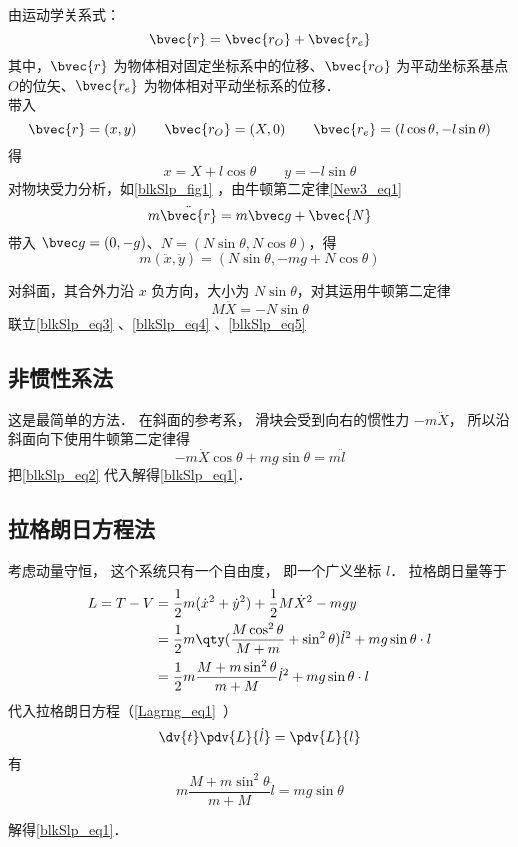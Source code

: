 由运动学关系式：
\begin{equation}
\bvec{r}=\bvec{r_{O}}+\bvec{r_{e}}
\end{equation}
其中，$\bvec{r}$ 为物体相对固定坐标系中的位移、$\bvec{r_{O}}$ 为平动坐标系基点$O$的位矢、$\bvec{r_{e}}$ 为物体相对平动坐标系的位移．\\
带入
\begin{equation}
\bvec{r}=(x,y)\qquad \bvec{r_O}=(X,0)\qquad \bvec{r_e}=(l\cos\theta,-l\sin\theta)
\end{equation}
得
\begin{equation}\label{blkSlp_eq3}
x=X+l\cos\theta \qquad y=-l\sin\theta
\end{equation}
对物块受力分析，如\autoref{blkSlp_fig1} ，由牛顿第二定律\autoref{New3_eq1}~
\begin{equation}
m\ddot{\bvec{r}}=m\bvec g+\bvec{N}
\end{equation}
带入 $\bvec g=(0,-g)$、$N=(N\sin\theta,N\cos\theta)$，得
\begin{equation}\label{blkSlp_eq4}
m(\ddot x,\ddot y)=(N\sin\theta,-mg+N\cos\theta)
\end{equation}

对斜面，其合外力沿 $x$ 负方向，大小为 $N\sin\theta$，对其运用牛顿第二定律
\begin{equation}\label{blkSlp_eq5}
M\ddot X=-N\sin \theta
\end{equation}
联立\autoref{blkSlp_eq3} 、\autoref{blkSlp_eq4} 、\autoref{blkSlp_eq5} 

\subsection{非惯性系法}
这是最简单的方法． 在斜面的参考系， 滑块会受到向右的惯性力 $-m\ddot X$， 所以沿斜面向下使用牛顿第二定律得
\begin{equation}
-m\ddot X\cos\theta + mg\sin\theta = m\ddot l
\end{equation}
把\autoref{blkSlp_eq2} 代入解得\autoref{blkSlp_eq1}．

\subsection{拉格朗日方程法}
考虑动量守恒， 这个系统只有一个自由度， 即一个广义坐标 $l$． 拉格朗日量等于
\begin{equation}
\begin{aligned}
L = T - V &= \frac12 m(\dot x^2 + \dot y^2) + \frac12 M \dot X^2 - mgy\\
&= \frac{1}{2}m \qty( \frac{M\cos^2\theta}{M + m}+\sin^2\theta) \dot l^2 + mg\sin\theta \cdot l\\
&=\frac{1}{2}m\frac{M+m\sin^2\theta}{m+M}\dot{l}^2+mg\sin\theta\cdot l
\end{aligned}
\end{equation}
代入拉格朗日方程（\autoref{Lagrng_eq1}~）
\begin{equation}
\dv{t} \pdv{L}{\dot l} = \pdv{L}{l}
\end{equation}
有
\begin{equation}
m\frac{M+m\sin^2\theta}{m+M}\ddot{l}=mg\sin\theta
\end{equation}

解得\autoref{blkSlp_eq1}．
